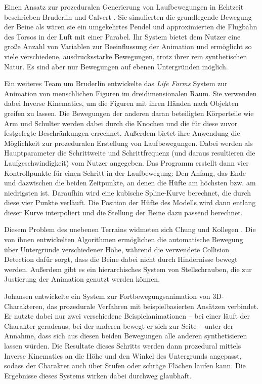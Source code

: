 Einen Ansatz zur prozeduralen Generierung von Laufbewegungen in Echtzeit beschrieben Bruderlin und Calvert \cite{bruderlin1993interactive} \cite{bruderlin1996knowledge}. Sie simulierten die grundlegende Bewegung der Beine als wären sie ein umgekehrtes Pendel und approximierten die Flugbahn des Torsos in der Luft mit einer Parabel. Ihr System bietet dem Nutzer eine große Anzahl von Variablen zur Beeinflussung der Animation und ermöglicht so viele verschiedene, ausdrucksstarke Bewegungen, trotz ihrer rein synthetischen Natur. Es sind aber nur Bewegungen auf ebenen Untergründen möglich.

Ein weiteres Team um Bruderlin \cite{bruderlin1994procedural} entwickelte das \textit{Life Forms} System zur Animation von menschlichen Figuren im dreidimensionalen Raum. Sie verwenden dabei Inverse Kinematics, um die Figuren mit ihren Händen nach Objekten greifen zu lassen. Die Bewegungen der anderen daran beteiligten Körperteile wie Arm und Schulter werden dabei durch die Knochen und die für diese zuvor festgelegte Beschränkungen errechnet. Außerdem bietet ihre Anwendung die Möglichkeit zur prozeduralen Erstellung von Laufbewegungen. Dabei werden als Hauptparameter die Schrittweite und Schrittfrequenz (und daraus resultieren die Laufgeschwindigkeit) vom Nutzer angegeben. Das Programm erstellt dann vier Kontrollpunkte für einen Schritt in der Laufbewegung: Den Anfang, das Ende und dazwischen die beiden Zeitpunkte, an denen die Hüfte am höchsten bzw. am niedrigsten ist. Daraufhin wird eine kubische Spline-Kurve berechnet, die durch diese vier Punkte verläuft. Die Position der Hüfte des Modells wird dann entlang dieser Kurve interpoliert und die Stellung der Beine dazu passend berechnet.

Diesem Problem des unebenen Terrains widmeten sich Chung und Kollegen \cite{chung1999animation}. Die von ihnen entwickelten Algorithmen ermöglichen die automatische Bewegung über Untergründe verschiedener Höhe, während die verwendete Collision Detection dafür sorgt, dass die Beine dabei nicht durch Hindernisse bewegt werden. Außerdem gibt es ein hierarchisches System von Stellschrauben, die zur Justierung der Animation genutzt werden können.

Johansen \cite{johansen2009automated} entwickelte ein System zur Fortbewegungsanimation von 3D-Charakteren, das prozedurale Verfahren mit beispielbasierten Ansätzen verbindet. Er nutzte dabei nur zwei verschiedene Beispielanimationen – bei einer läuft der Charakter geradeaus, bei der anderen bewegt er sich zur Seite – unter der Annahme, dass sich aus diesen beiden Bewegungen alle anderen synthetisieren lassen würden. Die Resultate dieses Schritts werden dann prozedural mittels Inverse Kinematics an die Höhe und den Winkel des Untergrunds angepasst, sodass der Charakter auch über Stufen oder schräge Flächen laufen kann. Die Ergebnisse dieses Systems wirken dabei durchweg glaubhaft.

